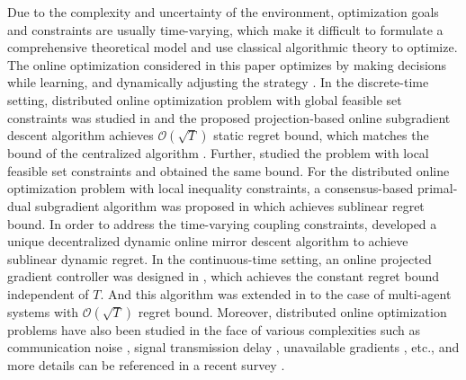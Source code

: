 \documentclass[final,5p,times,twocolumn,authoryear]{elsarticle}
\begin{document}
	Due to the complexity and uncertainty of the environment, optimization goals and constraints are usually time-varying, which make it difficult to formulate a comprehensive theoretical model and use classical algorithmic theory to optimize. The online optimization considered in this paper optimizes by making decisions while learning, and dynamically adjusting the strategy \citep{ss2011}. 
	In the discrete-time setting, distributed online optimization problem with global feasible set constraints was studied in \citet{yan2013} and the proposed projection-based online subgradient descent algorithm achieves $\mathcal{O}(\sqrt{T})$ static regret bound, which matches the bound of the centralized algorithm \citep{zink2003}. Further, \citet{kop2015} studied the problem with local feasible set constraints and obtained the same bound.
	For the distributed online optimization problem with local inequality constraints, a consensus-based primal-dual subgradient algorithm was proposed in \citet{yuan2018} which achieves sublinear regret bound. In order to address the time-varying coupling constraints, \citet{yi2020} developed a unique decentralized dynamic online  mirror descent algorithm to achieve sublinear dynamic regret. In the continuous-time setting, an online projected gradient controller was designed in \citet{pater2017}, which achieves the constant regret bound independent of $T$. And this algorithm was extended in \citet{pater2020} to the case of multi-agent systems with $\mathcal{O}(\sqrt{T})$ regret bound. Moreover, distributed online optimization problems have also been studied in the face of various complexities such as communication noise \citep{cao2021}, signal transmission delay \citep{cao2022},  unavailable gradients \citep{yi20212}, etc., and more details can be referenced in a recent survey \citep{li2022sur}.
		
\end{document}
